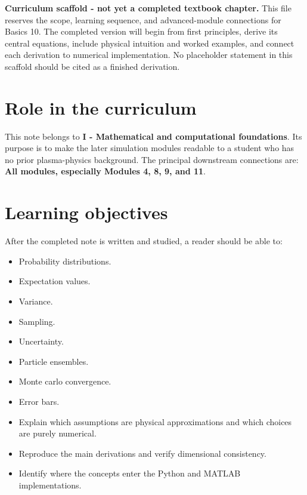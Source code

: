 \documentclass[11pt]{article}
\begin{document}

\begin{overviewbox}
\textbf{Curriculum scaffold - not yet a completed textbook chapter.} This file reserves the scope, learning sequence, and advanced-module connections for Basics 10. The completed version will begin from first principles, derive its central equations, include physical intuition and worked examples, and connect each derivation to numerical implementation. No placeholder statement in this scaffold should be cited as a finished derivation.
\end{overviewbox}

\ProjectTOC

\section{Role in the curriculum}
This note belongs to \textbf{I - Mathematical and computational foundations}. Its purpose is to make the later simulation modules readable to a student who has no prior plasma-physics background. The principal downstream connections are: \textbf{All modules, especially Modules 4, 8, 9, and 11}.

\section{Learning objectives}
After the completed note is written and studied, a reader should be able to:
\begin{itemize}[leftmargin=1.6em]
\item Probability distributions.
\item Expectation values.
\item Variance.
\item Sampling.
\item Uncertainty.
\item Particle ensembles.
\item Monte carlo convergence.
\item Error bars.
\item Explain which assumptions are physical approximations and which choices are purely numerical.
\item Reproduce the main derivations and verify dimensional consistency.
\item Identify where the concepts enter the Python and MATLAB implementations.
\end{itemize}
\end{document}
